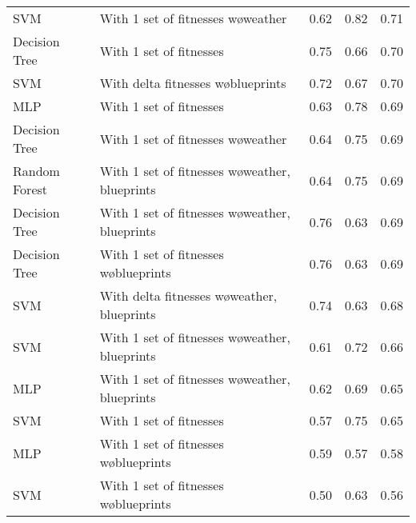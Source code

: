 \begin{tabular}{llrrr}
           SVM &             With 1 set of fitnesses w\o weather &       0.62 &    0.82 & 0.71 \\
 Decision Tree &                         With 1 set of fitnesses &       0.75 &    0.66 & 0.70 \\
           SVM &             With delta fitnesses w\o blueprints &       0.72 &    0.67 & 0.70 \\
           MLP &                         With 1 set of fitnesses &       0.63 &    0.78 & 0.69 \\
 Decision Tree &             With 1 set of fitnesses w\o weather &       0.64 &    0.75 & 0.69 \\
 Random Forest & With 1 set of fitnesses w\o weather, blueprints &       0.64 &    0.75 & 0.69 \\
 Decision Tree & With 1 set of fitnesses w\o weather, blueprints &       0.76 &    0.63 & 0.69 \\
 Decision Tree &          With 1 set of fitnesses w\o blueprints &       0.76 &    0.63 & 0.69 \\
           SVM &    With delta fitnesses w\o weather, blueprints &       0.74 &    0.63 & 0.68 \\
           SVM & With 1 set of fitnesses w\o weather, blueprints &       0.61 &    0.72 & 0.66 \\
           MLP & With 1 set of fitnesses w\o weather, blueprints &       0.62 &    0.69 & 0.65 \\
           SVM &                         With 1 set of fitnesses &       0.57 &    0.75 & 0.65 \\
           MLP &          With 1 set of fitnesses w\o blueprints &       0.59 &    0.57 & 0.58 \\
           SVM &          With 1 set of fitnesses w\o blueprints &       0.50 &    0.63 & 0.56 \\
\bottomrule
\end{tabular}
